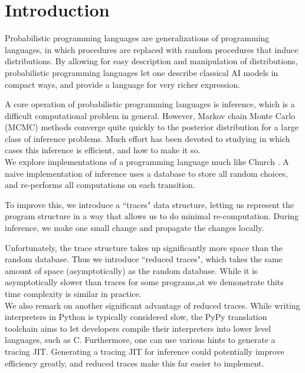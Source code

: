 \documentclass[10pt]{article}
\begin{document}
\section{Introduction}


Probabilistic programming languages are generalizations of programming languages, in which procedures are replaced with random procedures that induce distributions.  By allowing for easy description and manipulation of distributions, probabilistic programming languages let one describe classical AI models in compact ways, and provide a language for very richer expression.  

A core operation of probabilistic programming languages is inference, which is a difficult computational problem in general\cite{Dagum}.  However, Markov chain Monte Carlo (MCMC) methods converge quite quickly to the posterior distribution for a large class of inference problems.  Much effort has been devoted to studying in which cases this inference is efficient, and how to make it so.  \\

We explore implementations of a programming language much like Church \cite{Goodman}.  A naive implementation of inference uses a database to store all random choices, and re-performs all computations on each transition.  

To improve this, we introduce a ``traces" data structure, letting us represent the program structure in a way that allows us to do minimal re-computation.  During inference, we make one small change and propagate the changes locally. 

Unfortunately, the trace structure takes up significantly more space than the random database.  Thus we introduce ``reduced traces", which takes the same amount of space (asymptotically) as the random database.  While it is asymptotically slower than traces for some programs,at  we demonstrate thits time complexity is similar in practice.  \\

We also remark on another significant advantage of reduced traces.  While writing interpreters in Python is typically considered slow, the PyPy translation toolchain aims to let developers compile their interpreters into lower level languages, such as C.  %
Furthermore, one can use various hints to generate a tracing JIT.  Generating a tracing JIT for inference could potentially improve efficiency greatly, and reduced traces make this far easier to implement. \\
\end{document}
